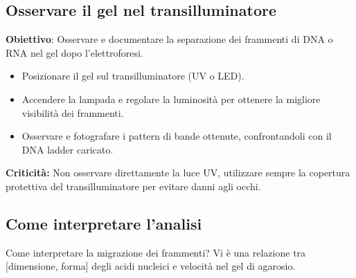     \begin{noSplitBlock}
  \subsection{Osservare il gel nel transilluminatore}

      {\footnotesize \textbf{Obiettivo}: Osservare e documentare la separazione dei frammenti di DNA o RNA nel gel dopo l’elettroforesi.}

      \begin{itemize}
          \item Posizionare il gel sul transilluminatore (UV o LED).
          \item Accendere la lampada e regolare la luminosità per ottenere la migliore visibilità dei frammenti.
          \item Osservare e fotografare i pattern di bande ottenute, confrontandoli con il DNA ladder caricato.
      \end{itemize}

      \begin{criticitaBox}
      \textbf{Criticità:} Non osservare direttamente la luce UV, utilizzare sempre la copertura protettiva del transilluminatore per evitare danni agli occhi.
      \end{criticitaBox}
\end{noSplitBlock}










\subsection{Come interpretare l’analisi}

Come interpretare la migrazione dei frammenti? 
\newline
Vi è una relazione tra [dimensione, forma] degli acidi nucleici e velocità nel gel di agarosio.


